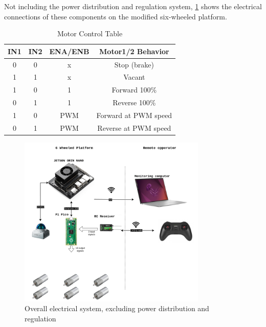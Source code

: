 \documentclass[11pt]{article}
\begin{document}
            Not including the power distribution and regulation system, \ref{fig:overall_electical_system} shows the electrical connections of these components on the modified six-wheeled platform.


            \begin{table}[h!]
                \centering
                \begin{tabular}{|c|c|c|c|}
                \hline
                IN1 & IN2 & ENA/ENB & Motor1/2 Behavior \\ \hline
                0   & 0   & x       & Stop (brake)      \\ \hline
                1   & 1   & x       & Vacant            \\ \hline
                1   & 0   & 1       & Forward 100\%     \\ \hline
                0   & 1   & 1       & Reverse 100\%     \\ \hline
                1   & 0   & PWM     & Forward at PWM speed \\ \hline
                0   & 1   & PWM     & Reverse at PWM speed \\ \hline
                \end{tabular}
                \caption{Motor Control Table}
                \label{tab:motor_control}
            \end{table}

            \begin{figure}[H]
                \centering
                
                \includegraphics[width=0.8\textwidth]{Images/PFE-Page-2.drawio.png}
                \caption{Overall electrical system, excluding power distribution and regulation}
                \label{fig:overall_electical_system}
            \end{figure}
\end{document}
